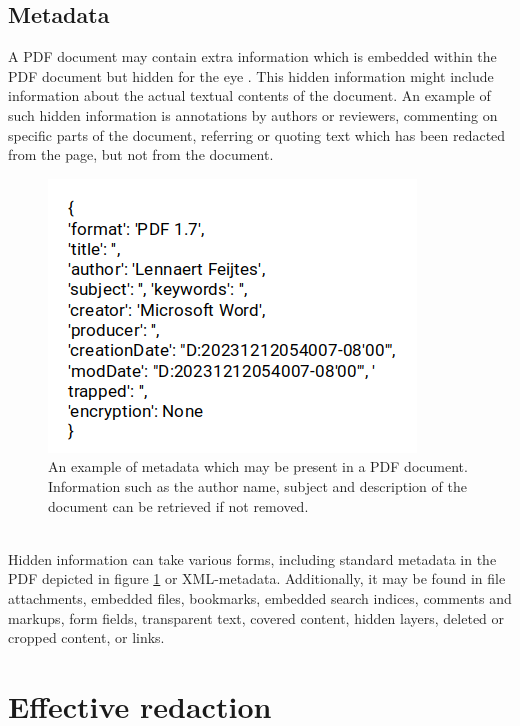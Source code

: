 \subsection{Metadata}
A PDF document may contain extra information which is embedded within the PDF document but hidden for the eye \cite{muller2021processing}. This hidden information might include information about the actual textual contents of the document. An example of such hidden information is annotations by authors or reviewers, commenting on specific parts of the document, referring or quoting text which has been redacted from the page, but not from the document. 
\begin{figure}[h]
    \includegraphics[width=0.5\linewidth]{latex/media/metadata.png}
    \centering
    \caption{An example of metadata which may be present in a PDF document. Information such as the author name, subject and description of the document can be retrieved if not removed.}
    \label{fig:metadataexmp}
\end{figure}\\
Hidden information can take various forms, including standard metadata in the PDF depicted in figure \ref{fig:metadataexmp} or XML-metadata. Additionally, it may be found in file attachments, embedded files, bookmarks, embedded search indices, comments and markups, form fields, transparent text, covered content, hidden layers, deleted or cropped content, or links.
\section{Effective redaction}

